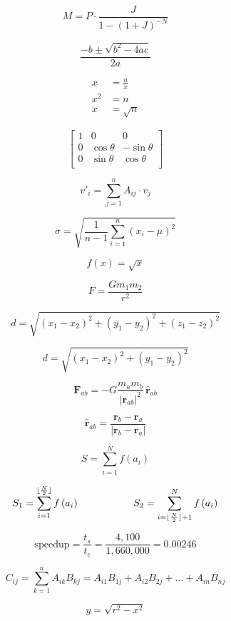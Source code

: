\documentclass[12pt]{article}
\begin{document}
$$
M = P \cdot \frac{J}{1 - (1 + J)^{-N}}
$$

$$
\frac{-b \pm \sqrt{b^2 - 4ac}}{2a}
$$


\begin{align*}
x &= \frac{n}{x} \\
x^2 &= n \\
x &= \sqrt{n}
\end{align*}

$$
\begin{bmatrix}
1 & 0 & 0 \\
0 & \cos \theta & -\sin \theta \\
0 & \sin \theta  & \cos \theta \\
\end{bmatrix}
$$

$$
v'_i = \sum_{j = 1}^n A_{ij}\cdot v_j
$$

$$
\sigma = \sqrt{\frac{1}{n - 1}\sum_{i = 1}^n (x_i - \mu)^2}
$$

$$
f(x) = \sqrt{x}
$$

$$
F = \frac{Gm_1m_2}{r^2}
$$

$$
d = \sqrt{(x_1 - x_2)^2 + (y_1 - y_2)^2 + (z_1 -  z_2)^2}
$$

$$
d = \sqrt{(x_1 - x_2)^2+(y_1 - y_2)^2}
$$

$$
\mathbf{F}_{ab} = - G \frac{m_a m_b}{{\vert \mathbf{r}_{ab} \vert}^2} \, \mathbf{\hat{r}}_{ab}
$$

$$
\mathbf{\hat{r}}_{ab} = \frac{\mathbf{r}_b - \mathbf{r}_a}{\vert\mathbf{r}_b - \mathbf{r}_a\vert}
$$

$$
S = \sum_{i=1}^N f\left(a_i\right)
$$

$$
S_1 = \sum_{i=1}^{\lfloor \frac{N}{2}\rfloor } f\left(a_i\right)\hspace{.75in}
S_2 = \sum_{i=\lfloor \frac{N}{2} \rfloor +1}^{N} f\left(a_i\right)
$$

$$
\mbox{speedup}=\frac{t_s}{t_c} = \frac{4,100}{1,660,000} = 0.00246
$$

$$
C_{ij} = \sum_{k = 1}^n A_{ik}B_{kj} = A_{i1}B_{1j} + A_{i2}B_{2j} + \ldots + A_{in}B_{nj}
$$

$$
y = \sqrt{r^2 - x^2}
$$
\end{document}

